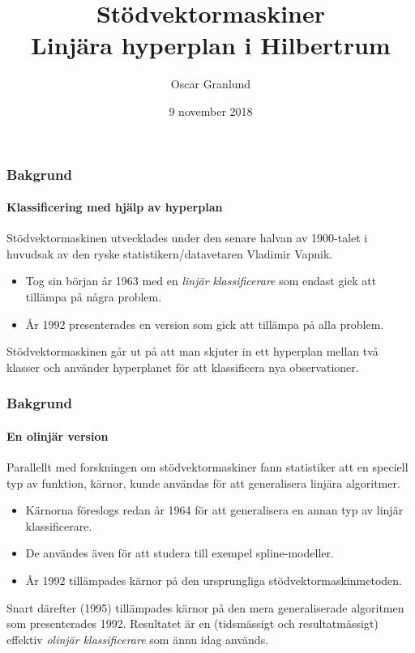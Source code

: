 \documentclass{beamer}
\title{{\Huge Stödvektormaskiner}\\
	{\LARGE Linjära hyperplan i Hilbertrum}}
\author{\Large Oscar Granlund}
\institute{{\large Kandidatavhandling i matematik}\\
	{\large Fakulteten för naturvetenskaper och teknik}\\
	{\large Åbo Akademi}}
\date{9 november 2018}
\theoremstyle{definition}
\theoremstyle{remark}
\begin{document}
\begin{frame}
	\titlepage
\end{frame}

\begin{frame}
	\frametitle{Bakgrund}
	\framesubtitle{Klassificering med hjälp av hyperplan}
	Stödvektormaskinen utvecklades under den senare halvan av 1900-talet i huvudsak av den ryske statistikern/datavetaren Vladimir Vapnik.
	\begin{itemize}
		\item 	Tog sin början år 1963 med en \emph{linjär klassificerare} som endast gick att tillämpa på några problem.
		\item 	År 1992 presenterades en version som gick att tillämpa på alla problem.
	\end{itemize}
	Stödvektormaskinen går ut på att man skjuter in ett hyperplan mellan två klasser och använder hyperplanet för att klassificera nya observationer.
\end{frame}

\begin{frame}
	\frametitle{Bakgrund}
	\framesubtitle{En olinjär version}
	Parallellt med forskningen om stödvektormaskiner fann statistiker att en speciell typ av funktion, kärnor, kunde användas för att generalisera linjära algoritmer.
	\begin{itemize}
		\item	Kärnorna föreslogs redan år 1964 för att generalisera en annan typ av linjär klassificerare.
		\item 	De användes även för att studera till exempel spline-modeller.
		\item 	År 1992 tillämpades kärnor på den ursprungliga stödvektormaskinmetoden.
	\end{itemize}
	Snart därefter (1995) tillämpades kärnor på den mera generaliserade algoritmen som presenterades 1992. Resultatet är en (tidsmässigt och resultatmässigt) effektiv \emph{olinjär klassificerare} som ännu idag används.
\end{frame}
\end{document}
